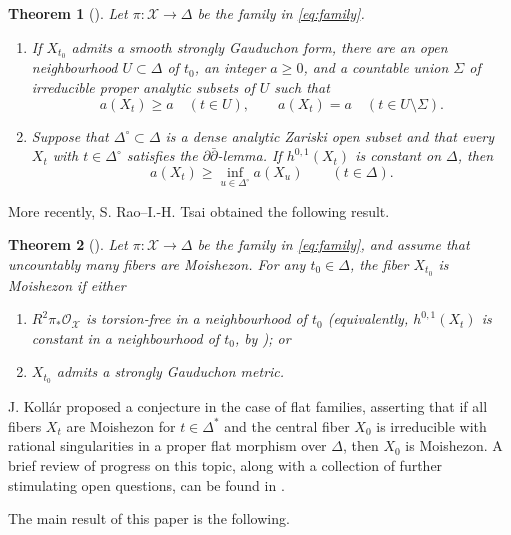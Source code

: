 \documentclass[11pt]{amsart}
\numberwithin{equation}{section}
\theoremstyle{plain}
\newtheorem{thm}{Theorem}[section]
\theoremstyle{definition}
\newcommand{\cO}{\mathcal O}
\newcommand{\cX}{\mathcal X}
\begin{document}
\begin{thm}[{\cite[Theorems~1.0.2 and~1.0.3]{Ba15}}]
\label{thm:barlet-semicontinuity}
Let $\pi:\cX\to\Delta$ be the family in \eqref{eq:family}.
\begin{enumerate}[$(i)$]
\item If $X_{t_0}$ admits a smooth strongly Gauduchon form, there are an
open neighbourhood $U\subset\Delta$ of $t_0$, an integer $a\ge0$, and a
countable union
$\Sigma$ of irreducible proper analytic subsets of $U$ 
such that
\[
 a(X_t)\ge a\quad(t\in U),
 \qquad a(X_t)=a\quad(t\in U\setminus\Sigma).
\]
\item Suppose that $\Delta^\circ\subset\Delta$ is a dense analytic Zariski
open subset and that every $X_t$ with $t\in\Delta^\circ$ satisfies the
$\partial\bar\partial$-lemma.
If $h^{0,1}(X_t)$ is constant on $\Delta$, then
\[
 a(X_t)\ge\inf_{u\in\Delta^\circ}a(X_u)\qquad(t\in\Delta).
\]
\end{enumerate}
\end{thm}

More recently, S. Rao--I.-H. Tsai obtained the following result.

\begin{thm}[{\cite[Theorem~1.4]{RT21}}]
\label{thm:rao-tsai}
Let $\pi:\cX\to\Delta$ be the family in \eqref{eq:family}, and assume
that uncountably many fibers are Moishezon.
For any $t_0\in\Delta$, the fiber $X_{t_0}$ is Moishezon if either
\begin{enumerate}[$(i)$]
\item $R^2\pi_*\cO_{\cX}$ is torsion-free in a neighbourhood of $t_0$
(equivalently, $h^{0,1}(X_t)$ is constant in a neighbourhood of $t_0$,
by \cite[Proposition~4.12]{RT21}); or
\item $X_{t_0}$ admits a strongly Gauduchon metric.
\end{enumerate}
\end{thm}



J. Koll\'ar \cite{Ko22} proposed a conjecture in the case of flat families, asserting that if all fibers \( X_t \) are Moishezon for \( t \in \Delta^* \) and the central fiber \( X_0 \) is irreducible with rational singularities in a proper flat morphism over \( \Delta \), then \( X_0 \) is Moishezon. A brief review of progress on this topic, along with a collection of further stimulating open questions, can be found in \cite[Section 1]{Ko22}. 

The main result of this paper is the following.
\end{document}
